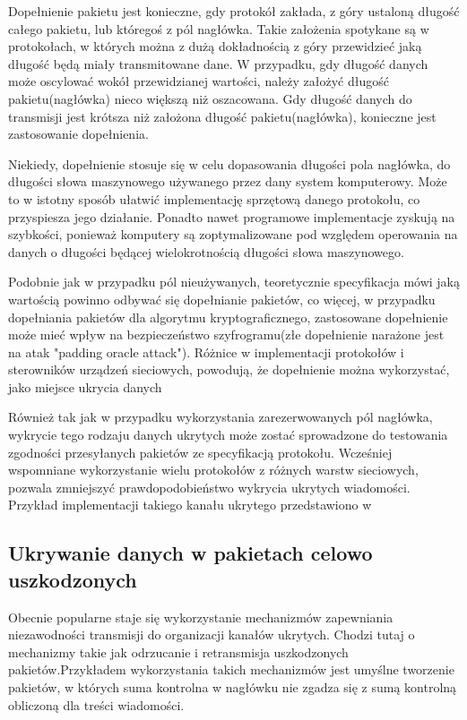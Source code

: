 \documentclass[a4paper, twoside]{report}
\begin{document}
        Dopełnienie pakietu jest konieczne, gdy protokół zakłada, z góry ustaloną długość
        całego pakietu, lub któregoś z pól nagłówka. Takie założenia spotykane są
        w protokołach, w których można z dużą dokładnością z góry przewidzieć jaką długość
        będą miały transmitowane dane. W przypadku, gdy długość danych może oscylować
        wokół przewidzianej wartości, należy założyć długość pakietu(nagłówka)
        nieco większą niż oszacowana. Gdy długość danych do transmisji jest krótsza niż
        założona długość pakietu(nagłówka), konieczne jest zastosowanie dopełnienia.

        Niekiedy, dopełnienie stosuje się w celu dopasowania długości pola nagłówka,
        do długości słowa maszynowego używanego przez dany system komputerowy. Może
        to w istotny sposób ułatwić implementację sprzętową danego protokołu, co
        przyspiesza jego działanie. Ponadto nawet programowe implementacje zyskują
        na szybkości, ponieważ komputery są zoptymalizowane pod względem operowania
        na danych o długości będącej wielokrotnością długości słowa maszynowego.

        Podobnie jak w przypadku pól nieużywanych, teoretycznie specyfikacja
        mówi jaką wartością powinno odbywać się dopełnianie pakietów, co więcej,
        w przypadku dopełniania pakietów dla algorytmu kryptograficznego, zastosowane
        dopełnienie może mieć wpływ na bezpieczeństwo szyfrogramu(złe dopełnienie narażone
        jest na atak "padding oracle attack"). Różnice w implementacji protokołów
        i sterowników urządzeń sieciowych, powodują, że dopełnienie można wykorzystać,
        jako miejsce ukrycia danych\cite{PADSTEG}

        Również tak jak w przypadku wykorzystania zarezerwowanych pól nagłówka,
        wykrycie tego rodzaju danych ukrytych może zostać sprowadzone do testowania
        zgodności przesyłanych pakietów ze specyfikacją protokołu. Wcześniej wspomniane
        wykorzystanie wielu protokołów z różnych warstw sieciowych, pozwala zmniejszyć
        prawdopodobieństwo wykrycia ukrytych wiadomości. Przykład implementacji
        takiego kanału ukrytego przedstawiono w \cite{PADSTEG}

        \subsection{Ukrywanie danych w pakietach celowo uszkodzonych}
        Obecnie popularne staje się wykorzystanie mechanizmów zapewniania niezawodności
        transmisji do organizacji kanałów ukrytych. Chodzi tutaj o mechanizmy
        takie jak odrzucanie i retransmisja uszkodzonych pakietów.Przykładem wykorzystania takich
        mechanizmów jest umyślne tworzenie pakietów, w których suma kontrolna w nagłówku
        nie zgadza się z sumą kontrolną obliczoną dla treści wiadomości.
\end{document}

